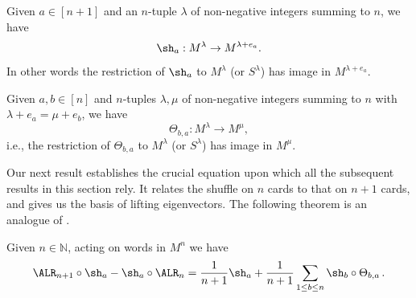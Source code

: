 \documentclass[11pt]{report}
\begin{document}
\begin{lemma}
	\label{chpt5:lem:linearrestriction}
	Given $a \in [n+1]$ and an $n$-tuple $\lambda$ of non-negative integers 
	summing to $n$, we have
	$$
	\sh_{a}: M^{\lambda} \to M^{\lambda+e_a}.
	$$
	In other words the restriction of $\sh_{a}$ to $M^\lambda$ (or $S^{\lambda}$) has image in 
	$M^{\lambda+e_a}$. 	
	
	Given $a,b \in [n]$ and $n$-tuples $\lambda,\mu$ of non-negative 
	integers summing to $n$ with $\lambda+e_{a} = \mu +e_{b}$, we have
	$$ \Theta_{b,a}:M^{\lambda} \rightarrow M^{\mu},$$
	i.e., the restriction of $\Theta_{b,a}$ to $M^\lambda$ (or $S^{\lambda}$) has image in 
	$M^{\mu}$.
\end{lemma}






Our next result 
establishes the crucial equation upon which all the subsequent results in this section rely.  It relates the shuffle on $n$ cards to that on $n+1$ cards, and gives us the basis of lifting eigenvectors. The following theorem is an analogue of \cite[Theorem 38]{dieker2018spectral}.

\begin{thm}
	\label{chpt5:thm:master}
	Given $n \in \mathbb{N}$, acting on words in $M^{n}$ we have
	\begin{equation}
	\ALR_{n+1} \circ \sh_{a} - \sh_{a} \circ \ALR_{n} = 
	\frac{1}{n+1}\sh_{a} + 
	\frac{1}{n+1}\sum_{1 \leq b \leq n} \sh_{b}\circ\Theta_{b,a} \,. 
	\label{mastereq}
	\end{equation}
\end{thm}
\end{document}
